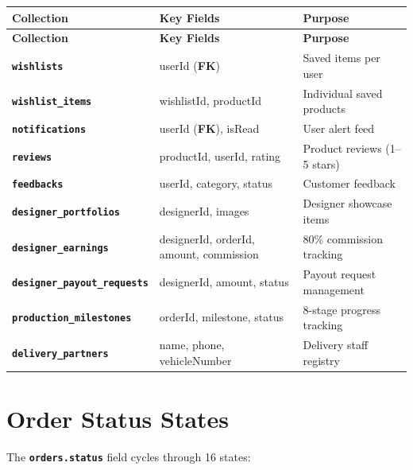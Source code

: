 \documentclass[a4paper,11pt]{article}
\newcommand{\fk}{\textcolor{warning}{\textbf{FK}}}
\newcommand{\coll}[1]{\textcolor{primary}{\texttt{\textbf{#1}}}}
\begin{document}
\begin{longtable}{@{}L{4.5cm}L{3.5cm}L{5cm}@{}}
\toprule
{}
\textbf{Collection} & \textbf{Key Fields} & \textbf{Purpose} \\
\midrule
\endfirsthead
\toprule
{}
\textbf{Collection} & \textbf{Key Fields} & \textbf{Purpose} \\
\midrule
\endhead
\bottomrule
\endlastfoot
\coll{wishlists}               & userId (\fk)              & Saved items per user \\
\coll{wishlist\_items}         & wishlistId, productId     & Individual saved products \\
\coll{notifications}           & userId (\fk), isRead      & User alert feed \\
\coll{reviews}                 & productId, userId, rating & Product reviews (1--5 stars) \\
\coll{feedbacks}               & userId, category, status  & Customer feedback \\
\coll{designer\_portfolios}    & designerId, images        & Designer showcase items \\
\coll{designer\_earnings}      & designerId, orderId, amount, commission & 80\% commission tracking \\
\coll{designer\_payout\_requests} & designerId, amount, status & Payout request management \\
\coll{production\_milestones}  & orderId, milestone, status & 8-stage progress tracking \\
\coll{delivery\_partners}      & name, phone, vehicleNumber & Delivery staff registry \\
\end{longtable}

\section{Order Status States}
\label{sec:statuses}

The \coll{orders.status} field cycles through 16 states:
\end{document}
